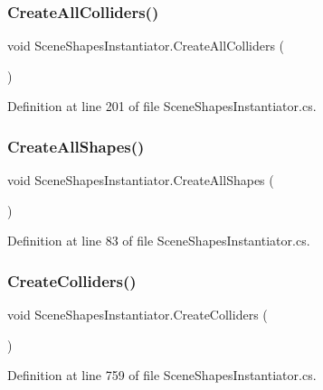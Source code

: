 \subsubsection{\texorpdfstring{CreateAllColliders()}{CreateAllColliders()}}
{\footnotesize\ttfamily void Scene\+Shapes\+Instantiator.\+Create\+All\+Colliders (\begin{DoxyParamCaption}{ }\end{DoxyParamCaption})}



Definition at line 201 of file Scene\+Shapes\+Instantiator.\+cs.

\mbox{\label{class_scene_shapes_instantiator_a65c7dea0e58715677f41651a4e4cbc08}} 
\subsubsection{\texorpdfstring{CreateAllShapes()}{CreateAllShapes()}}
{\footnotesize\ttfamily void Scene\+Shapes\+Instantiator.\+Create\+All\+Shapes (\begin{DoxyParamCaption}{ }\end{DoxyParamCaption})}



Definition at line 83 of file Scene\+Shapes\+Instantiator.\+cs.

\mbox{\label{class_scene_shapes_instantiator_a39f8076e858d5c0b4b72253e07199553}} 
\subsubsection{\texorpdfstring{CreateColliders()}{CreateColliders()}}
{\footnotesize\ttfamily void Scene\+Shapes\+Instantiator.\+Create\+Colliders (\begin{DoxyParamCaption}{ }\end{DoxyParamCaption})}



Definition at line 759 of file Scene\+Shapes\+Instantiator.\+cs.

\mbox{\label{class_scene_shapes_instantiator_a62e5a27617df3d1dd071d74365e197f1}} 
